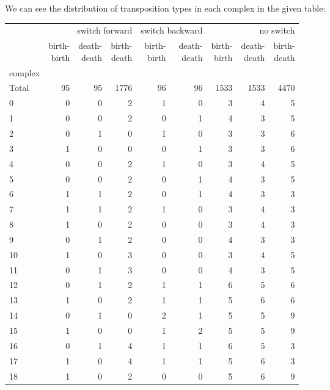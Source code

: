 \documentclass{article}
\begin{document}
\par We can see the distribution of transposition types in each complex in the given table:
\begin{center}
\begin{tabular}{lrrrrrrrr}
\toprule
& \multicolumn{3}{r}{switch forward} & \multicolumn{2}{r}{switch backward} & \multicolumn{3}{r}{no switch} \\
& \makecell{birth-\\birth} & \makecell{death-\\death} & \makecell{birth-\\death} & \makecell{birth-\\birth} & \makecell{death-\\death} & \makecell{birth-\\birth} & \makecell{death-\\death} & \makecell{birth-\\death} \\
complex &  &  &  &  &  &  &  &  \\
\midrule
Total & 95 & 95 & 1776 & 96 & 96 & 1533 & 1533 & 4470 \\
0 & 0 & 0 & 2 & 1 & 0 & 3 & 4 & 5 \\
1 & 0 & 0 & 2 & 0 & 1 & 4 & 3 & 5 \\
2 & 0 & 1 & 0 & 1 & 0 & 3 & 3 & 6 \\
3 & 1 & 0 & 0 & 0 & 1 & 3 & 3 & 6 \\
4 & 0 & 0 & 2 & 1 & 0 & 3 & 4 & 5 \\
5 & 0 & 0 & 2 & 0 & 1 & 4 & 3 & 5 \\
6 & 1 & 1 & 2 & 0 & 1 & 4 & 3 & 3 \\
7 & 1 & 1 & 2 & 1 & 0 & 3 & 4 & 3 \\
8 & 1 & 0 & 2 & 0 & 0 & 3 & 4 & 3 \\
9 & 0 & 1 & 2 & 0 & 0 & 4 & 3 & 3 \\
10 & 1 & 0 & 3 & 0 & 0 & 3 & 4 & 5 \\
11 & 0 & 1 & 3 & 0 & 0 & 4 & 3 & 5 \\
12 & 0 & 1 & 2 & 1 & 1 & 6 & 5 & 6 \\
13 & 1 & 0 & 2 & 1 & 1 & 5 & 6 & 6 \\
14 & 0 & 1 & 0 & 2 & 1 & 5 & 5 & 9 \\
15 & 1 & 0 & 0 & 1 & 2 & 5 & 5 & 9 \\
16 & 0 & 1 & 4 & 1 & 1 & 6 & 5 & 3 \\
17 & 1 & 0 & 4 & 1 & 1 & 5 & 6 & 3 \\
18 & 1 & 0 & 2 & 0 & 0 & 5 & 6 & 9 \\

\end{tabular}
\end{center}
\end{document}
